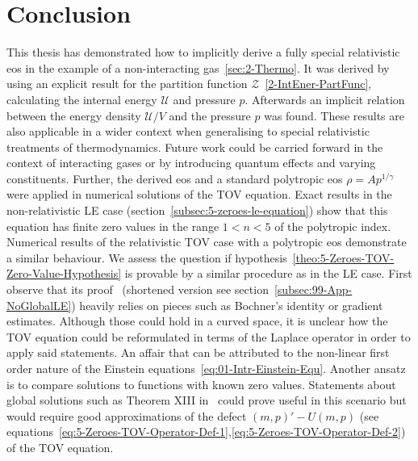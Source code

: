 \section{Conclusion}
\label{sec:80-Outlook}
This thesis has demonstrated how to implicitly derive a fully special relativistic \ac{eos} in the example of a non-interacting gas~\ref{sec:2-Thermo}.
It was derived by using an explicit result for the partition function $\mathcal{Z}$~\ref{2-IntEner-PartFunc}, calculating the internal energy $\mathcal{U}$ and pressure $p$.
Afterwards an implicit relation between the energy density $\mathcal{U}/V$ and the pressure $p$ was found.
These results are also applicable in a wider context when generalising to special relativistic treatments of thermodynamics.
Future work could be carried forward in the context of interacting gases or by introducing quantum effects and varying constituents.
Further, the derived \ac{eos} and a standard polytropic \ac{eos} $\rho=Ap^{1/\gamma}$ were applied in numerical solutions of the \ac{TOV} equation.
Exact results in the non-relativistic \ac{LE} case (section~\ref{subsec:5-zeroes-le-equation}) show that this equation has finite zero values in the range $1<n<5$ of the polytropic index.
Numerical results of the relativistic \ac{TOV} case with a polytropic \ac{eos} demonstrate a similar behaviour.
We assess the question if hypothesis~\ref{theo:5-Zeroes-TOV-Zero-Value-Hypothesis} is provable by a similar procedure as in the \ac{LE} case.
First observe that its proof~\cite{quittnerSuperlinearParabolicProblems2007} (shortened version see section~\ref{subsec:99-App-NoGlobalLE}) heavily relies on pieces such as Bochner's identity or gradient estimates.
Although those could hold in a curved space, it is unclear how the \ac{TOV} equation could be reformulated in terms of the Laplace operator in order to apply said statements.
An affair that can be attributed to the non-linear first order nature of the Einstein equations~\ref{eq:01-Intr-Einstein-Equ}.
Another ansatz is to compare solutions to functions with known zero values.
Statements about global solutions such as Theorem XIII in~\cite[p. 99]{walterOrdinaryDifferentialEquations1998} could prove useful in this scenario but would require good approximations of the defect $(m,p)'-U(m,p)$ (see equations~\ref{eq:5-Zeroes-TOV-Operator-Def-1},\ref{eq:5-Zeroes-TOV-Operator-Def-2}) of the \ac{TOV} equation.\\
